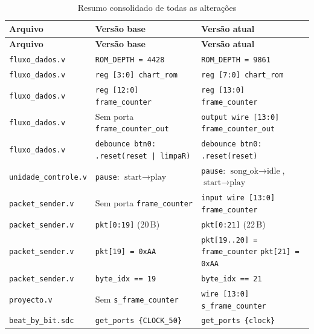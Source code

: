 \documentclass[12pt, a4paper]{article}
\begin{document}
\begin{longtable}{p{3.5cm} p{5cm} p{5cm}}
\caption{Resumo consolidado de todas as alterações} \label{tab:consolidado} \\
\toprule
\textbf{Arquivo} & \textbf{Versão base} & \textbf{Versão atual} \\
\midrule
\endfirsthead
\toprule
\textbf{Arquivo} & \textbf{Versão base} & \textbf{Versão atual} \\
\midrule
\endhead
\bottomrule
\endfoot

\texttt{fluxo\_dados.v} &
    \texttt{ROM\_DEPTH = 4428} &
    \texttt{ROM\_DEPTH = 9861} \\[4pt]

\texttt{fluxo\_dados.v} &
    \texttt{reg [3:0] chart\_rom} &
    \texttt{reg [7:0] chart\_rom} \\[4pt]

\texttt{fluxo\_dados.v} &
    \texttt{reg [12:0] frame\_counter} &
    \texttt{reg [13:0] frame\_counter} \\[4pt]

\texttt{fluxo\_dados.v} &
    Sem porta \texttt{frame\_counter\_out} &
    \texttt{output wire [13:0] frame\_counter\_out} \\[4pt]

\texttt{fluxo\_dados.v} &
    \texttt{debounce btn0:} \newline \texttt{.reset(reset | limpaR)} &
    \texttt{debounce btn0:} \newline \texttt{.reset(reset)} \\[4pt]

\texttt{unidade\_controle.v} &
    \texttt{pause}: \newline $\text{start} \to \text{play}$ &
    \texttt{pause}: \newline $\text{song\_ok} \to \text{idle}$, $\text{start} \to \text{play}$ \\[4pt]

\texttt{packet\_sender.v} &
    Sem porta \texttt{frame\_counter} &
    \texttt{input wire [13:0] frame\_counter} \\[4pt]

\texttt{packet\_sender.v} &
    \texttt{pkt[0:19]} (20\,B) &
    \texttt{pkt[0:21]} (22\,B) \\[4pt]

\texttt{packet\_sender.v} &
    \texttt{pkt[19] = 0xAA} &
    \texttt{pkt[19..20] = frame\_counter} \newline \texttt{pkt[21] = 0xAA} \\[4pt]

\texttt{packet\_sender.v} &
    \texttt{byte\_idx == 19} &
    \texttt{byte\_idx == 21} \\[4pt]

\texttt{proyecto.v} &
    Sem \texttt{s\_frame\_counter} &
    \texttt{wire [13:0] s\_frame\_counter} \\[4pt]

\texttt{beat\_by\_bit.sdc} &
    \texttt{get\_ports \{CLOCK\_50\}} &
    \texttt{get\_ports \{clock\}} \\

\end{longtable}
\end{document}
